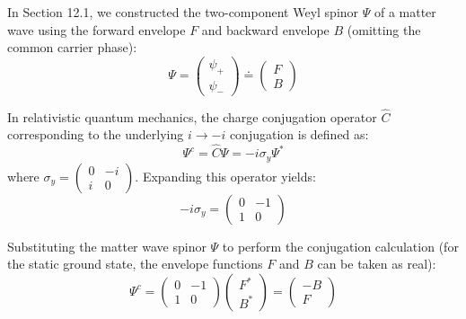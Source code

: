 \documentclass[12pt, a4paper]{article}
\begin{document}
In Section 12.1, we constructed the two-component Weyl spinor $\Psi$ of a matter wave using the forward envelope $F$ and backward envelope $B$ (omitting the common carrier phase):
\begin{equation}
    \Psi = \begin{pmatrix} \psi_+ \\ \psi_- \end{pmatrix} \doteq \begin{pmatrix} F \\ B \end{pmatrix} 
\end{equation}

In relativistic quantum mechanics, the charge conjugation operator $\hat{C}$ corresponding to the underlying $i \to -i$ conjugation is defined as:
\begin{equation}
    \Psi^c = \hat{C}\Psi = -i \sigma_y \Psi^* 
\end{equation}
where $\sigma_y = \begin{pmatrix} 0 & -i \\ i & 0 \end{pmatrix}$. Expanding this operator yields:
\begin{equation}
    -i \sigma_y = \begin{pmatrix} 0 & -1 \\ 1 & 0 \end{pmatrix} 
\end{equation}

Substituting the matter wave spinor $\Psi$ to perform the conjugation calculation (for the static ground state, the envelope functions $F$ and $B$ can be taken as real):
\begin{equation}
    \Psi^c = \begin{pmatrix} 0 & -1 \\ 1 & 0 \end{pmatrix} \begin{pmatrix} F^* \\ B^* \end{pmatrix} = \begin{pmatrix} -B \\ F \end{pmatrix} \label{eq:charge_conjugate_spinor}
\end{equation}
\end{document}

